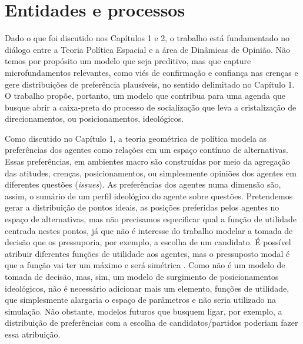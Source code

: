 \section{Entidades e processos}

Dado o que foi discutido nos Capítulos 1 e 2, o trabalho está fundamentado no
diálogo entre a Teoria Política Espacial e a área de Dinâmicas de Opinião. Não
temos por propósito um modelo que seja preditivo, mas que capture
microfundamentos relevantes, como viés de confirmação e confiança nas crenças e
gere distribuições de preferência plausíveis, no sentido delimitado no Capítulo
1. O trabalho propõe, portanto, um modelo que contribua para uma agenda que
busque abrir a caixa-preta do processo de socialização que leva a cristalização
de direcionamentos, ou posicionamentos, ideológicos.

Como discutido no Capítulo 1, a teoria geométrica de política modela as
preferências dos agentes como relações em um espaço contínuo de alternativas.
Essas preferências, em ambientes macro são construídas por meio da agregação das
atitudes, crenças, posicionamentos, ou simplesmente opiniões dos agentes em
diferentes questões (\textit{issues}). As preferências dos agentes numa dimensão
são, assim, o sumário de um perfil ideológico do agente sobre questões.
Pretendemos gerar a distribuição de pontos ideais, as posições preferidas pelos
agentes no espaço de alternativas, mas não precisamos especificar qual a função
de utilidade centrada nestes pontos, já que não é interesse do trabalho modelar
a tomada de decisão que os pressuporia, por exemplo, a escolha de um candidato.
É possível atribuir diferentes funções de utilidade aos agentes, mas o
pressuposto modal é que a função vai ter um máximo e será simétrica
\cite{eguia2013spatial, carroll2013structure}. Como não é um modelo de tomada de
decisão, mas, sim, um modelo de surgimento de posicionamentos ideológicos, não é
necessário adicionar mais um elemento, funções de utilidade, que simplesmente
alargaria o espaço de parâmetros e não seria utilizado na simulação. Não
obstante, modelos futuros que busquem ligar, por exemplo, a distribuição de
preferências com a escolha de candidatos/partidos poderiam fazer essa
atribuição.


